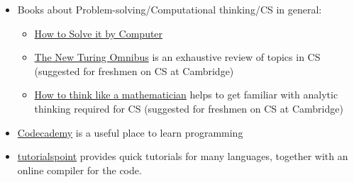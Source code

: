 \documentclass{article}
\begin{document}
\begin{itemize}
    \item Books about Problem-solving/Computational thinking/CS in general:
    \begin{itemize}

        \item \href{https://www.goodreads.com/book/show/3086628-how-to-solve-it-by-computer}{How to Solve it by Computer}

    
        \item \href{https://www.goodreads.com/book/show/964709.The_New_Turing_Omnibus}{The New Turing Omnibus} is an exhaustive review of topics in CS (suggested for freshmen on CS at Cambridge)
    
        \item \href{https://www.goodreads.com/book/show/6220915-how-to-think-like-a-mathematician}{How to think like a mathematician} helps to get familiar with analytic thinking required for CS (suggested for freshmen on CS at Cambridge)
    
    \end{itemize}
    
    \item \href{https://www.codecademy.com/}{Codecademy} is a useful place to learn programming
    
    \item \href{https://www.tutorialspoint.com/computer_programming_tutorials.htm}{tutorialspoint} provides quick tutorials for many languages, together with an online compiler for the code.


\end{itemize}
\end{document}
